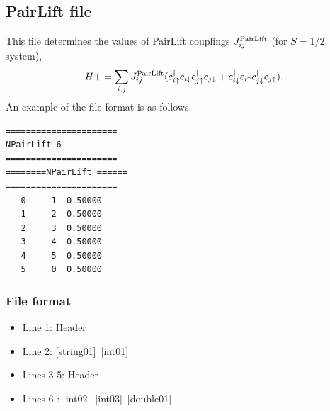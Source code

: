 \subsection{PairLift file}
\label{Subsec:pairlift}
This file determines the values of PairLift couplings $J_{ij}^{\rm PairLift}$ {(for $S=1/2$ system)},
\begin{equation}
H+=\sum_{i,j}J_{ij}^{\rm PairLift} (c_ {i \uparrow}^{\dag}c_{i\downarrow}c_{j \uparrow}^{\dag}c_{j \downarrow}+c_ {i \downarrow}^{\dag}c_{i\uparrow}c_{j \downarrow}^{\dag}c_{j \uparrow}).
\end{equation}
An example of the file format is as follows.

\begin{minipage}{12.5cm}
\begin{screen}
\begin{verbatim}
====================== 
NPairLift 6  
====================== 
========NPairLift ====== 
====================== 
   0     1  0.50000
   1     2  0.50000
   2     3  0.50000
   3     4  0.50000
   4     5  0.50000
   5     0  0.50000
\end{verbatim}
\end{screen}
\end{minipage}

\subsubsection{File format}
 \begin{itemize}
   \item  Line 1:  Header
   \item  Line 2:   [string01]~[int01]
   \item  Lines 3-5:  Header
   \item  Lines 6-: 
   [int02]~[int03]~[double01] .
  \end{itemize}
